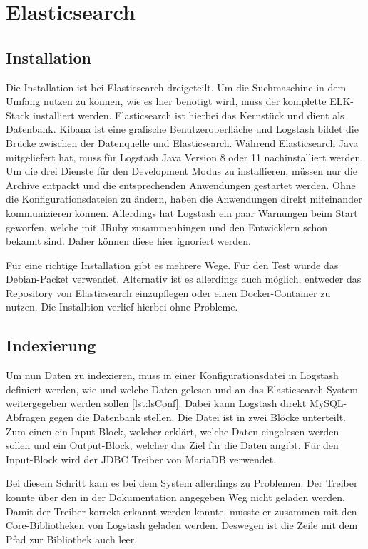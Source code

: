 
\section{Elasticsearch}

\subsection{Installation}

Die Installation ist bei Elasticsearch dreigeteilt. Um die Suchmaschine in dem Umfang nutzen zu können, wie es hier benötigt wird, muss der komplette ELK-Stack installiert werden. Elasticsearch ist hierbei das Kernstück und dient als Datenbank. Kibana ist eine grafische Benutzeroberfläche und Logstash bildet die Brücke zwischen der Datenquelle und Elasticsearch. Während Elasticsearch Java mitgeliefert hat, muss für Logstash Java Version 8 oder 11 nachinstalliert werden. Um die drei Dienste für den Development Modus zu installieren, müssen nur die Archive entpackt und die entsprechenden Anwendungen gestartet werden. Ohne die Konfigurationsdateien zu ändern, haben die Anwendungen direkt miteinander kommunizieren können. Allerdings hat Logstash ein paar Warnungen beim Start geworfen, welche mit JRuby zusammenhingen und den Entwicklern schon bekannt sind. Daher können diese hier ignoriert werden.

Für eine richtige Installation gibt es mehrere Wege. Für den Test wurde das Debian-Packet verwendet. Alternativ ist es allerdings auch möglich, entweder das Repository von Elasticsearch einzupflegen oder einen Docker-Container zu nutzen. Die Installtion verlief hierbei ohne Probleme.

\subsection{Indexierung}
\label{elaVgl:index}

Um nun Daten zu indexieren, muss in einer Konfigurationsdatei in Logstash definiert werden, wie und welche Daten gelesen und an das Elasticsearch System weitergegeben werden sollen \ref{lst:lsConf}. Dabei kann Logstash direkt MySQL-Abfragen gegen die Datenbank stellen. Die Datei ist in zwei Blöcke unterteilt. Zum einen ein Input-Block, welcher erklärt, welche Daten eingelesen werden sollen und ein Output-Block, welcher das Ziel für die Daten angibt. Für den Input-Block wird der JDBC Treiber von MariaDB verwendet.

Bei diesem Schritt kam es bei dem System allerdings zu Problemen. Der Treiber konnte über den in der Dokumentation angegeben Weg nicht geladen werden. Damit der Treiber korrekt erkannt werden konnte, musste er zusammen mit den Core-Bibliotheken von Logstash geladen werden. Deswegen ist die Zeile mit dem Pfad zur Bibliothek auch leer. 

